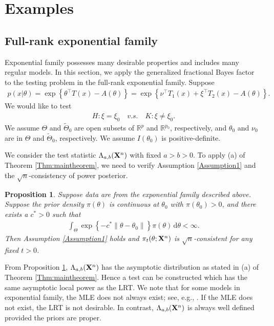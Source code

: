 \documentclass[11pt]{article}
\newcommand{\myT}{\intercal}
\theoremstyle{plain}
\newtheorem{proposition}{\quad\quad Proposition}
\theoremstyle{definition}
\theoremstyle{remark}
\begin{document}
    \section{Examples} \label{sec:examples}

    \subsection{Full-rank exponential family}\label{sec:exponentialFamily}
Exponential family possesses many desirable properties and includes many regular models.
In this section, we apply the generalized fractional Bayes factor to the testing problem in the full-rank exponential family.
Suppose 
\begin{align*}
    p(x|\theta)
    =\exp \left\{ \theta^\myT  T(x)-A(\theta) \right\}
    =\exp \left\{ \nu^\myT  T_1(x) + \xi^\myT T_2 (x) -A(\theta) \right\}
    .
\end{align*}
We would like to test
\begin{align*}
    H:\xi= \xi_0 \quad v.s.\quad K: \xi\neq \xi_0. 
\end{align*}
We assume $\Theta$ and $\tilde{\Theta}_0$ are open subsets of $\mathbb{R}^p$ and $\mathbb R^{p_0}$, respectively,
and $\theta_0$ and $\nu_0$ are in $\Theta$ and $\tilde{\Theta}_0$, respectively.
We assume $I(\theta_0)$ is positive-definite.

We consider the test statistic $\Lambda_{a,b}(\mathbf{X}^n)$ with fixed $a>b> 0$.
To apply (a) of Theorem \ref{Thm:maintheorem},
we need to verify Assumption \ref{Assumption1} and the $\sqrt n$-consistency of power posterior.
\begin{proposition}\label{exponentialCon}
    Suppose data are from the exponential family described above.
    Suppose the prior density $\pi(\theta)$ is continuous at $\theta_0$ with $\pi(\theta_0) > 0$, and there exists a $c^* > 0$ such that
    \begin{align*}
        \int_{\Theta} 
        \exp\left\{- c^* \|\theta-\theta_0\|  \right\}
        \pi(\theta)\, \mathrm d\theta
        < \infty
        .
    \end{align*}
    Then Assumption \ref{Assumption1} holds and $\pi_{t}(\theta ;\mathbf{X}^{n})$ is $\sqrt n$-consistent for any fixed $t>0$.
\end{proposition}
From Proposition \ref{exponentialCon}, $\Lambda_{a,b}(\mathbf{X}^n)$ has the asymptotic distribution as stated in (a) of Theorem \ref{Thm:maintheorem}.
Hence a test can be constructed which has the same asymptotic local power as the LRT.
We note that for some models in exponential family, the MLE does not always exist; see, e.g., \cite{Rinaldo2013}.
If the MLE does not exist, the LRT is not desirable.
In contrast, $\Lambda_{a,b}(\mathbf{X}^n)$ is always well defined provided the priors are proper.
\end{document}
